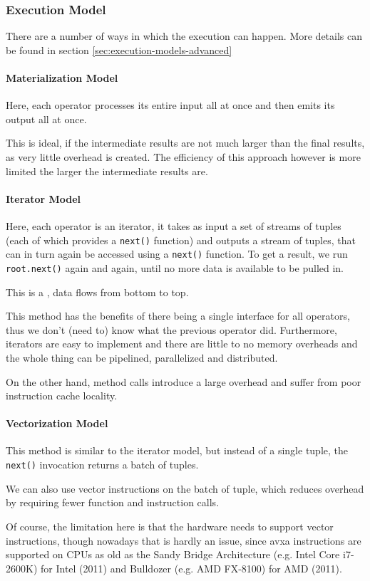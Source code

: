 \subsubsection{Execution Model}
\label{sec:execution-models}
There are a number of ways in which the execution can happen. More details can be found in section \ref{sec:execution-models-advanced}


\paragraph{Materialization Model}
Here, each operator processes its entire input all at once and then emits its output all at once.

This is ideal, if the intermediate results are not much larger than the final results, as very little overhead is created.
The efficiency of this approach however is more limited the larger the intermediate results are.


\paragraph{Iterator Model}
Here, each operator is an iterator, it takes as input a set of streams of tuples (each of which provides a \texttt{next()} function) and outputs a stream of tuples,
that can in turn again be accessed using a \texttt{next()} function.
To get a result, we run \texttt{root.next()} again and again, until no more data is available to be pulled in.

This is a , data flows from bottom to top.

This method has the benefits of there being a single interface for all operators, thus we don't (need to) know what the previous operator did.
Furthermore, iterators are easy to implement and there are little to no memory overheads and the whole thing can be pipelined, parallelized and distributed.

On the other hand, method calls introduce a large overhead and suffer from poor instruction cache locality.


\paragraph{Vectorization Model}
This method is similar to the iterator model, but instead of a single tuple, the \texttt{next()} invocation returns a batch of tuples.

We can also use vector instructions on the batch of tuple, which reduces overhead by requiring fewer function and instruction calls.

Of course, the limitation here is that the hardware needs to support vector instructions, though nowadays that is hardly an issue,
since \acrshort{avxa} instructions are supported on CPUs as old as the Sandy Bridge Architecture (e.g. Intel Core i7-2600K) for Intel (2011) and Bulldozer (e.g. AMD FX-8100) for AMD (2011).
